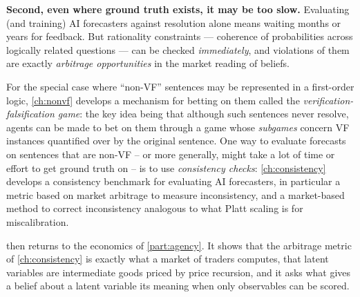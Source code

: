 \begin{draftblock}
\textbf{Second, even where ground truth exists, it may be too slow.} Evaluating (and training) AI forecasters against resolution alone means waiting months or years for feedback. But rationality constraints --- coherence of probabilities across logically related questions --- can be checked \emph{immediately}, and violations of them are exactly \emph{arbitrage opportunities} in the market reading of beliefs.
\end{draftblock}

For the special case where ``non-VF'' sentences may be represented in a first-order logic, \cref{ch:nonvf} develops a mechanism for betting on them called the \emph{verification-falsification game}: the key idea being that although such sentences never resolve, agents can be made to bet on them through a game whose \emph{subgames} concern VF instances quantified over by the original sentence. One way to evaluate forecasts on sentences that are non-VF -- or more generally, might take a lot of time or effort to get ground truth on -- is to use \emph{consistency checks}: \cref{ch:consistency} develops a consistency benchmark for evaluating AI forecasters, in particular a metric based on market arbitrage to measure inconsistency, and a market-based method to correct inconsistency analogous to what Platt scaling is for miscalibration.

\begin{draftblock}
 then returns to the economics of \cref{part:agency}. It shows that the arbitrage metric of \cref{ch:consistency} is exactly what a market of traders computes, that latent variables are intermediate goods priced by price recursion, and it asks what gives a belief about a latent variable its meaning when only observables can be scored.
\end{draftblock}
